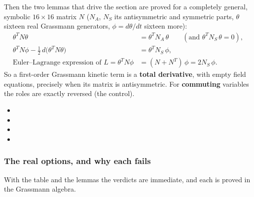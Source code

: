 Then the two lemmas that drive the section are proved for a completely general, symbolic
$16\times16$ matrix $N$ ($N_A$, $N_S$ its antisymmetric and symmetric parts, $\theta$ sixteen real
Grassmann generators, $\phi=d\theta/dt$ sixteen more):
\begin{align*}
  \theta^{T}N\theta &= \theta^{T}N_A\,\theta \qquad(\text{and } \theta^{T}N_S\,\theta=0),\\
  \theta^{T}N\phi-\tfrac12\,d\bigl(\theta^{T}N\theta\bigr) &= \theta^{T}N_S\,\phi,\\
  \text{Euler--Lagrange expression of } L=\theta^{T}N\phi &= (N+N^{T})\,\phi=2N_S\,\phi .
\end{align*}
So a first-order Grassmann kinetic term is a \textbf{total derivative}, with empty field equations,
precisely when its matrix is antisymmetric. For \textbf{commuting} variables the roles are exactly
reversed (the control). 
\begin{itemize}
  \item {}
  \item {}
  \item {}
  \item {}
\end{itemize}

\subsubsection{The real options, and why each fails}
\label{sec:3.2.4}

With the table and the lemmas the verdicts are immediate, and each is proved in the Grassmann
algebra.

